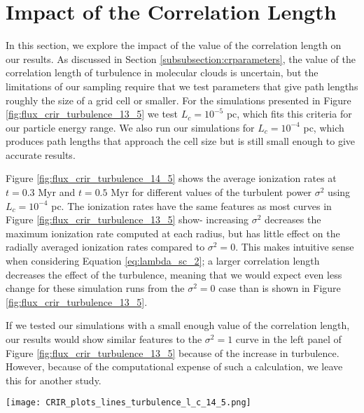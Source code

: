 \documentclass[twocolumn]{aastex63}
\begin{document}
\section{Impact of the Correlation Length}
\label{appendix:turbulence_additional}

In this section, we explore the impact of the value of the correlation length on our results. As discussed in Section \ref{subsubsection:crparameters}, the value of the correlation length of turbulence in molecular clouds is uncertain, but the limitations of our sampling require that we test parameters that give path lengths roughly the size of a grid cell or smaller. For the simulations presented in Figure \ref{fig:flux_crir_turbulence_13_5} we test $L_c=10^{-5}$ pc, which fits this criteria for our particle energy range. We also run our simulations for $L_c=10^{-4}$ pc, which produces path lengths that approach the cell size but is still small enough to give accurate results. 

Figure \ref{fig:flux_crir_turbulence_14_5} shows the average ionization rates at $t=0.3$ Myr and $t=0.5$ Myr for different values of the turbulent power $\sigma^2$ using $L_c=10^{-4}$ pc. The ionization rates have the same features as most curves in Figure \ref{fig:flux_crir_turbulence_13_5} show- increasing $\sigma^2$ decreases the maximum ionization rate computed at each radius, but has little effect on the radially averaged ionization rates compared to $\sigma^2=0$. This makes intuitive sense when considering Equation \ref{eq:lambda_sc_2}; a larger correlation length decreases the effect of the turbulence, meaning that we would expect even less change for these simulation runs from the $\sigma^2=0$ case than is shown in Figure \ref{fig:flux_crir_turbulence_13_5}. 

If we tested our simulations with a small enough value of the correlation length, our results would show similar features to the $\sigma^2=1$ curve in the left panel of Figure \ref{fig:flux_crir_turbulence_13_5} because of the increase in turbulence. However, because of the computational expense of such a calculation, we leave this for another study.

\begin{figure*}
\centering
\texttt{[image: CRIR\_plots\_lines\_turbulence\_l\_c\_14\_5.png]}
\caption{Average ionization rate as a function of radius for $t=0.3$ Myr and $t=0.5$ Myr using $\rm L_c=10^{-4}$ pc. Turbulent power is indicated by the shade of blue. Maximum values of any angular bin at a given radius are shown by the green points, with larger dots symbolizing more turbulence. Dashed lines and translucent points at $r>0.05$ pc indicate the region where our results may be uncertain due to our simulation boundary conditions. The gray line indicates $\zeta=10^{-16} \rm s^{-1}$, which is the measured ionization rate for the Milky Way.}
\label{fig:flux_crir_turbulence_14_5}
\end{figure*}
\end{document}
